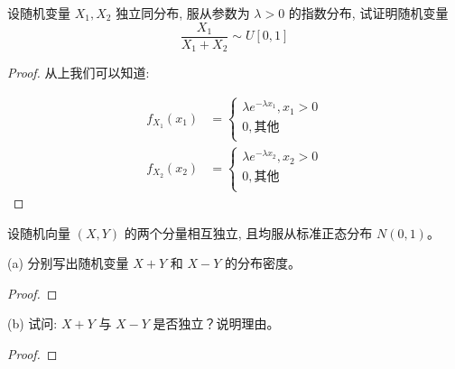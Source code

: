 \documentclass[a4,10pt]{ctexart}
\begin{document}
\begin{ti}{1}{}
\begin{qj}
    
        

    \end{qj}
    \end{ti}
    
    \begin{ti}{2}{}

    设随机变量 $X_1, X_2$ 独立同分布, 服从参数为 $\lambda>0$ 的指数分布, 试证明随机变量
    \begin{equation}
    \frac{X_1}{X_1+X_2} \sim U[0,1] 
   \end{equation}
    
    \begin{proof}
    从上我们可以知道:
    
    \begin{align}
        f_{X_1}(x_1) &=   \begin{cases}
            \lambda e^{-\lambda x_1}, x_1>0 \\
            0, \mbox{其他}\\
        \end{cases} \\
        f_{X_2}(x_2) &=  \begin{cases}
            \lambda e^{-\lambda x_2}, x_2>0 \\
            0, \mbox{其他}\\
        \end{cases}
    \end{align}
    
    \end{proof}
    \end{ti}
    
    \begin{ti}{3}{}

    设随机向量 $(X, Y)$ 的两个分量相互独立, 且均服从标准正态分布 $N(0,1)$。
    
    (a) 分别写出随机变量 $X+Y$ 和 $X-Y$ 的分布密度。
    
    \begin{proof}
    \end{proof}
    
    (b) 试问: $X+Y$ 与 $X-Y$ 是否独立？说明理由。
    
    \begin{proof}
    \end{proof}
    \end{ti}
    
\end{document}
